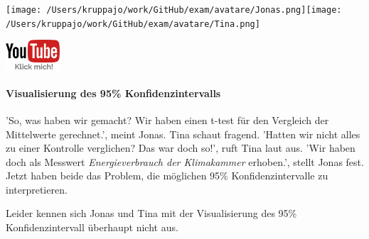 \documentclass[a4paper, 9pt]{scrartcl}\usepackage[]{graphicx}\usepackage[]{xcolor}
\begin{document}
 
\begin{minipage}[t]{0.5\textwidth}
\texttt{[image: /Users/kruppajo/work/GitHub/exam/avatare/Jonas.png]}\hspace{-4mm}\texttt{[image: /Users/kruppajo/work/GitHub/exam/avatare/Tina.png]}
\end{minipage}
\begin{minipage}[t]{0.5\textwidth}
\hfill
\href{https://youtu.be/CN_O4fYPbhs}{\includegraphics[width = 2cm]{img/youtube}}
\end{minipage}



\paragraph{Visualisierung des 95\% Konfidenzintervalls}

'So, was haben wir gemacht? Wir haben einen t-test für den Vergleich der Mittelwerte gerechnet.', meint Jonas. Tina schaut fragend. 'Hatten wir nicht alles zu einer Kontrolle verglichen? Das war doch so!', ruft Tina laut aus. 'Wir haben doch als Messwert \textit{Energieverbrauch der Klimakammer} erhoben.', stellt Jonas fest. Jetzt haben beide das Problem, die möglichen 95\% Konfidenzintervalle zu interpretieren.

\vspace{1ex}

Leider kennen sich Jonas und Tina mit der Visualisierung des 95\% Konfidenzintervall überhaupt nicht aus. 
\end{document}
